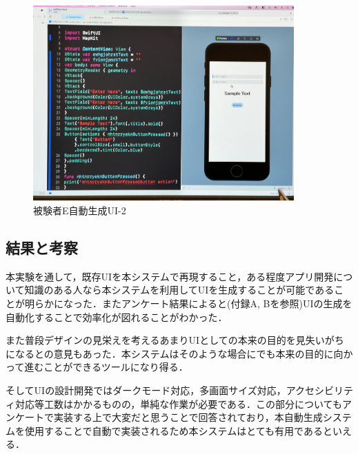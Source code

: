 \begin{figure}[htbp]
  \begin{minipage}{\hsize}
    \begin{center}
       \includegraphics[width=100mm]{img/usertest_autogen_5-2.jpeg}
    \end{center}
    \caption{被験者E自動生成UI-2}
    \label{fig:usertest_autogen_5-2}
  \end{minipage}
\end{figure}



\subsection{結果と考察}
本実験を通して，既存UIを本システムで再現すること，ある程度アプリ開発について知識のある人なら本システムを利用してUIを生成することが可能であることが明らかになった．またアンケート結果によると(付録A, Bを参照)UIの生成を自動化することで効率化が図れることがわかった．

また普段デザインの見栄えを考えるあまりUIとしての本来の目的を見失いがちになるとの意見もあった．本システムはそのような場合にでも本来の目的に向かって進むことができるツールになり得る．

そしてUIの設計開発ではダークモード対応，多画面サイズ対応，アクセシビリティ対応等工数はかかるものの，単純な作業が必要である．この部分についてもアンケートで実装する上で大変だと思うことで回答されており，本自動生成システムを使用することで自動で実装されるため本システムはとても有用であるといえる．





















